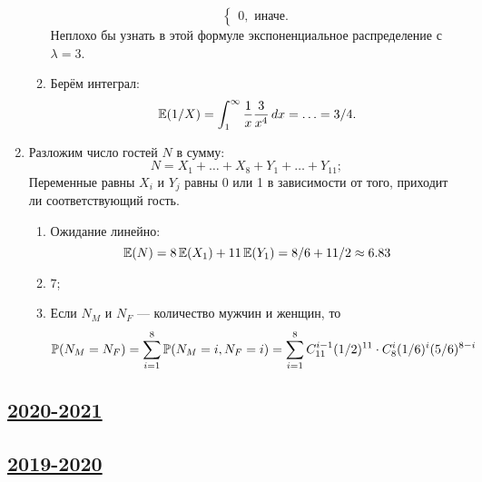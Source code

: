 \begin{enumerate}
\begin{enumerate}
\[\begin{cases}
				0, \text{ иначе.}
			\end{cases}
		\]
		Неплохо бы узнать в этой формуле экспоненциальное распределение с $\lambda = 3$.
		\item Берём интеграл:
		\[
		\E(1/X) = \int_1^{\infty} \frac{1}{x}\frac{3}{x^4} \, dx = \ldots = 3/4.
		\]
	\end{enumerate}
	\item Разложим число гостей $N$ в сумму:
	\[
	N = X_1 + \ldots + X_8 + Y_1 + \ldots + Y_{11};	
	\]
	Переменные равны $X_i$ и $Y_j$ равны 0 или 1 в зависимости от того, приходит ли соответствующий гость. 
	\begin{enumerate}
		\item Ожидание линейно:
		\[
		\E(N) = 8 \E(X_1) + 11 \E(Y_1) = 8/6 + 11/2 \approx 6.83	
		\]
		\item $7$;
		\item Если $N_M$ и $N_F$ — количество мужчин и женщин, то 
		\[
		\P(N_M = N_F) = \sum_{i=1}^8 \P(N_M = i, N_F = i) = \sum_{i=1}^{8} C_{11}^{i-1} (1/2)^{11} \cdot C_8^i (1/6)^i (5/6)^{8-i}	
		\]
		
	\end{enumerate}
\end{enumerate}


\subsection[2020-2021]{\hyperref[sec:kr_01_2020_2021]{2020-2021}}
\label{sec:sol_kr_01_2020_2021}



\subsection[2019-2020]{\hyperref[sec:kr_01_2019_2020]{2019-2020}}
\label{sec:sol_kr_01_2019_2020}

